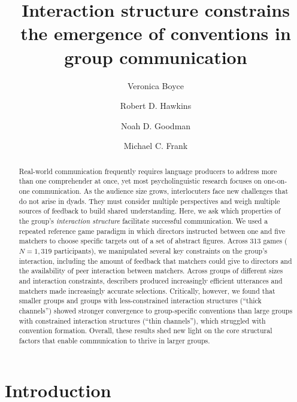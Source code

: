 \documentclass[
  english,
]{article}
\title{Interaction structure constrains\\
the emergence of conventions in group communication}
\affil[\addrlblbycode{#1}]{\MyRef{ADDRTXT}{#1}}}%
\author[%
\addrlblbycode{Stanford}%
,%
$\anotelblbycode{corresp}$%
]{Veronica Boyce}
\author[%
\addrlblbycode{UW-Madison}%
]{Robert D. Hawkins}
\author[%
\addrlblbycode{Stanford}%
]{Noah D. Goodman}
\author[%
\addrlblbycode{Stanford}%
]{Michael C. Frank}
\date{}
\begin{document}
\maketitle





\begin{otherlanguage}{english}

\begin{abstract}
Real-world communication frequently requires language producers to address more than one comprehender at once, yet most psycholinguistic research focuses on one-on-one communication.
As the audience size grows, interlocuters face new challenges that do not arise in dyads.
They must consider multiple perspectives and weigh multiple sources of feedback to build shared understanding.
Here, we ask which properties of the group's \emph{interaction structure} facilitate successful communication.
We used a repeated reference game paradigm in which directors instructed between one and five matchers to choose specific targets out of a set of abstract figures.
Across 313 games (\(N=1,319\) participants), we manipulated several key constraints on the group's interaction, including the amount of feedback that matchers could give to directors and the availability of peer interaction between matchers.
Across groups of different sizes and interaction constraints, describers produced increasingly efficient utterances and matchers made increasingly accurate selections.
Critically, however, we found that smaller groups and groups with less-constrained interaction structures (``thick channels'') showed stronger convergence to group-specific conventions than large groups with constrained interaction structures (``thin channels''), which struggled with convention formation.
Overall, these results shed new light on the core structural factors that enable communication to thrive in larger groups.

\end{abstract}

\end{otherlanguage}

\section{Introduction}\label{introduction}
\end{document}
